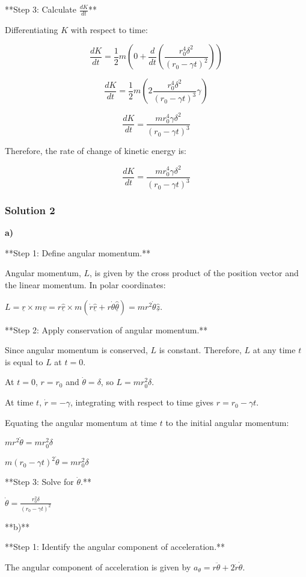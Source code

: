 \documentclass{article}
\begin{document}
**Step 3: Calculate $\frac{dK}{dt}$**

Differentiating $K$ with respect to time:

\[\frac{dK}{dt} = \frac{1}{2}m\left(0 + \frac{d}{dt}\left(\frac{r_0^4\delta^2}{(r_0 - \gamma t)^2}\right)\right)\]

\[\frac{dK}{dt} = \frac{1}{2}m\left(2\frac{r_0^4\delta^2}{(r_0 - \gamma t)^3}\gamma\right)\]

\[\frac{dK}{dt} = \frac{mr_0^4\gamma\delta^2}{(r_0 - \gamma t)^3}\]

Therefore, the rate of change of kinetic energy is:

\[\boxed{\frac{dK}{dt} = \frac{mr_0^4\gamma\delta^2}{(r_0 - \gamma t)^3}}\]

\subsubsection{Solution 2}
\textbf{a)}

**Step 1: Define angular momentum.**

Angular momentum, $L$, is given by the cross product of the position vector and the linear momentum. In polar coordinates:

$L = \underline{r} \times m\underline{v} = r\underline{\hat{r}} \times m(\dot{r}\underline{\hat{r}} + r\dot{\theta}\underline{\hat{\theta}}) = mr^2\dot{\theta}\underline{\hat{z}}$.

**Step 2: Apply conservation of angular momentum.**

Since angular momentum is conserved, $L$ is constant. Therefore, $L$ at any time $t$ is equal to $L$ at $t=0$.

At $t=0$, $r=r_0$ and $\dot{\theta}=\delta$, so $L = mr_0^2\delta$.

At time $t$, $\dot{r} = -\gamma$, integrating with respect to time gives $r = r_0 - \gamma t$.

Equating the angular momentum at time $t$ to the initial angular momentum:

$mr^2\dot{\theta} = mr_0^2\delta$

$m(r_0 - \gamma t)^2\dot{\theta} = mr_0^2\delta$

**Step 3: Solve for $\dot{\theta}$.**

$\dot{\theta} = \frac{r_0^2\delta}{(r_0 - \gamma t)^2}$

**b)**

**Step 1: Identify the angular component of acceleration.**

The angular component of acceleration is given by $a_{\theta} = r\ddot{\theta} + 2\dot{r}\dot{\theta}$.
\end{document}
